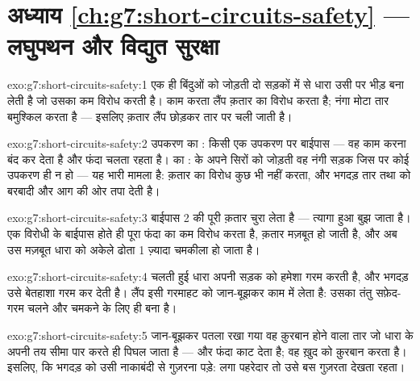 \section*{अध्याय \ref{ch:g7:short-circuits-safety} --- लघुपथन और विद्युत सुरक्षा}

\begin{solution}{exo:g7:short-circuits-safety:1}
एक ही बिंदुओं को जोड़ती दो सड़कों में से धारा उसी पर भीड़ बना लेती है
जो उसका कम विरोध करती है। काम करता लैंप क़तार का विरोध करता है; नंगा
मोटा तार बमुश्किल करता है --- इसलिए क़तार लैंप छोड़कर तार पर चली जाती
है।
\end{solution}

\begin{solution}{exo:g7:short-circuits-safety:2}
उपकरण का : किसी एक उपकरण पर बाईपास --- वह काम करना बंद कर देता
है और फंदा चलता रहता है।  का :  के अपने सिरों को
जोड़ती वह नंगी सड़क जिस पर कोई उपकरण ही न हो --- यह भारी मामला है:
क़तार का विरोध कुछ भी नहीं करता, और भगदड़ तार तथा  को बरबादी और
आग की ओर तपा देती है।
\end{solution}

\begin{solution}{exo:g7:short-circuits-safety:3}
बाईपास  2 की पूरी क़तार चुरा लेता है --- त्यागा हुआ  बुझ जाता
है। एक विरोधी के बाईपास होते ही पूरा फंदा  का कम विरोध करता है,
क़तार मज़बूत हो जाती है, और अब उस मज़बूत धारा को अकेले ढोता  1
ज़्यादा चमकीला हो जाता है।
\end{solution}

\begin{solution}{exo:g7:short-circuits-safety:4}
चलती हुई धारा अपनी सड़क को हमेशा गरम करती है, और भगदड़ उसे बेतहाशा
गरम कर देती है। लैंप इसी गरमाहट को जान-बूझकर काम में लेता है: उसका
तंतु सफ़ेद-गरम चलने और चमकने के लिए ही बना है।
\end{solution}

\begin{solution}{exo:g7:short-circuits-safety:5}
जान-बूझकर पतला रखा गया वह क़ुरबान होने वाला तार जो धारा के अपनी तय
सीमा पार करते ही पिघल जाता है --- और फंदा काट देता है; वह ख़ुद को
क़ुरबान करता है।  इसलिए, कि भगदड़ को उसी नाकाबंदी से गुज़रना
पड़े:  लगा पहरेदार तो उसे बस गुज़रता देखता रहता।
\end{solution}

